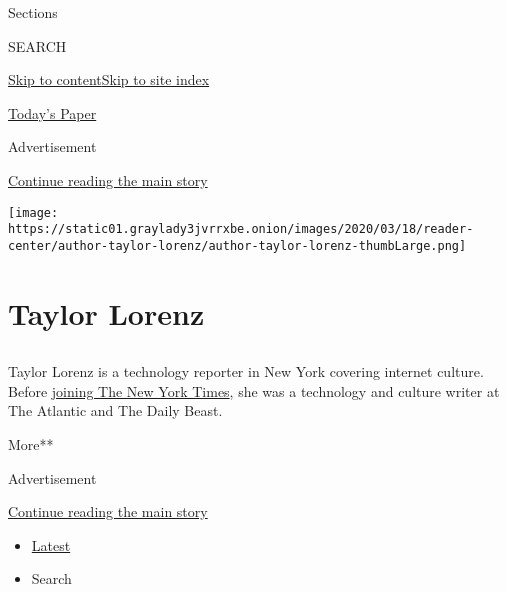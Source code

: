 Sections

SEARCH

\protect\hyperlink{site-content}{Skip to
content}\protect\hyperlink{site-index}{Skip to site index}

\href{https://myaccount.nytimes3xbfgragh.onion/auth/login?response_type=cookie\&client_id=vi}{}

\href{https://www.nytimes3xbfgragh.onion/section/todayspaper}{Today's
Paper}

Advertisement

\protect\hyperlink{after-top}{Continue reading the main story}

\texttt{[image: https://static01.graylady3jvrrxbe.onion/images/2020/03/18/reader-center/author-taylor-lorenz/author-taylor-lorenz-thumbLarge.png]}

\hypertarget{taylor-lorenz}{%
\section{Taylor Lorenz}\label{taylor-lorenz}}

\subsection{}

Taylor Lorenz is a technology reporter in New York covering internet
culture. Before
\href{https://www.nytco.com/press/taylor-lorenz-to-join-styles/}{joining
The New York Times}, she was a technology and culture writer at The
Atlantic and The Daily Beast.

More**

Advertisement

\protect\hyperlink{after-mid1}{Continue reading the main story}

\begin{itemize}
\tightlist
\item
  \protect\hyperlink{stream-panel}{Latest}
\item
  Search
\end{itemize}

